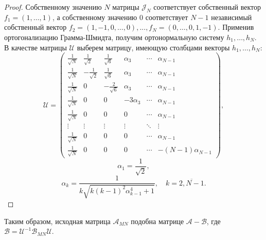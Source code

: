 \begin{proof}
    Собственному значению \( N \) матрицы \( \mathcal{J}_N \) 
    соответствует собственный вектор \( f_1 = {\left(1,\ldots,1\right)} \),
        а собственному значению \( 0 \) соответствует \( N-1 \) независимый собственный вектор
        \( f_2 = {\left(1,-1,0,\ldots,0\right)}, ...,
           f_N = {\left(0,\ldots,0,1,-1\right)} \).
    Применив ортогонализацию Грамма-Шмидта, получим ортонормальную систему \( h_1, \ldots, h_N \).
    В качестве матрицы \( \mathcal{U} \) выберем матрицу,
    имеющую столбцами векторы \( h_1, \ldots, h_N \):
    \[ \mathcal{U} =
    \begin{pmatrix}
        \frac{1}{\sqrt N} &  \frac{1}{\sqrt2} &  \frac{1}{\sqrt{6}} &   \alpha_3 & \cdots & \alpha_{N-1} \\
        \frac{1}{\sqrt N} & -\frac{1}{\sqrt2} &  \frac{1}{\sqrt{6}} &   \alpha_3 & \cdots & \alpha_{N-1} \\
        \frac{1}{\sqrt N} & 0                 & -\frac{2}{\sqrt{6}} &   \alpha_3 & \cdots & \alpha_{N-1} \\
        \frac{1}{\sqrt N} & 0                 &  0                  & -3\alpha_3 & \cdots & \alpha_{N-1} \\
        \frac{1}{\sqrt N} & 0                 &  0                  & 0          & \cdots & \alpha_{N-1} \\
        \vdots    & \vdots            &  \vdots             & \vdots     & \ddots & \vdots  \\
        \frac{1}{\sqrt N} & 0                 &  0                  & 0          & \cdots & \alpha_{N-1} \\
        \frac{1}{\sqrt N} & 0                 &  0                  & 0          & \cdots & -(N-1)\alpha_{N-1}
    \end{pmatrix},\]
    \[
        \alpha_1 = \frac{1}{\sqrt{2}}, \]
    \[
        \alpha_k = \frac{1}{k\sqrt{k(k-1)^2 \alpha_{k-1}^4 + 1}}, \quad k=\overline{2,N-1}.\]
\end{proof}

Таким образом, исходная матрица \( \mathcal{A}_{MN} \) подобна матрице
\( \mathcal{A} - \mathcal{B} \), где \( \mathcal{B} = \mathcal{U}^{-1} \mathscr{B}_{MN} \mathcal{U} \).
